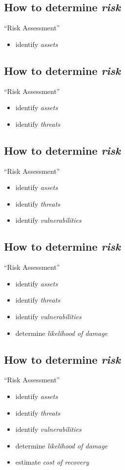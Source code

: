 \documentclass[xga]{xdvislides}
\begin{document}
\subsection{How to determine {\em risk}}
``Risk Assessment''
\begin{itemize}
	\item identify {\em assets}
\end{itemize}

\subsection{How to determine {\em risk}}
``Risk Assessment''
\begin{itemize}
	\item identify {\em assets}
	\item identify {\em threats}
\end{itemize}


\subsection{How to determine {\em risk}}
``Risk Assessment''
\begin{itemize}
	\item identify {\em assets}
	\item identify {\em threats}
	\item identify {\em vulnerabilities}
\end{itemize}

\subsection{How to determine {\em risk}}
``Risk Assessment''
\begin{itemize}
	\item identify {\em assets}
	\item identify {\em threats}
	\item identify {\em vulnerabilities}
	\item determine {\em likelihood of damage}
\end{itemize}

\subsection{How to determine {\em risk}}
``Risk Assessment''
\begin{itemize}
	\item identify {\em assets}
	\item identify {\em threats}
	\item identify {\em vulnerabilities}
	\item determine {\em likelihood of damage}
	\item estimate {\em cost of recovery}
\end{itemize}
\end{document}
